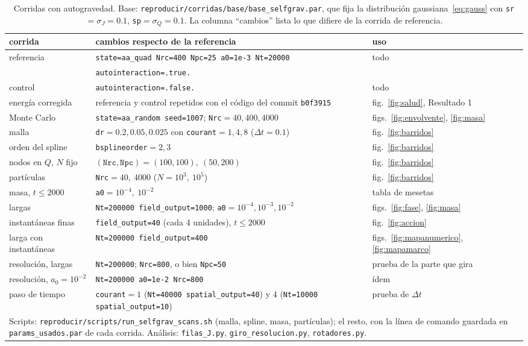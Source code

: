 \documentclass[11pt,a4paper]{article}
\newcommand{\Qr}{Q}
\theoremstyle{definition}
\begin{document}
\begin{table}[ht]
\centering
\small
\caption{Corridas con autogravedad. Base: \texttt{reproducir/corridas/base/base\_selfgrav.par}, que
fija la distribución gaussiana~\eqref{eq:gauss} con \texttt{sr}$=\sigma_J=0.1$,
\texttt{sp}$=\sigma_Q=0.1$. La columna ``cambios'' lista lo que difiere de la corrida
de referencia.}
\label{tab:autogravedad}
\footnotesize
\begin{tabular}{p{}p{}p{}}
\toprule
corrida & cambios respecto de la referencia & uso \\
\midrule
referencia & \texttt{state=aa\_quad Nrc=400 Npc=25 a0=1e-3 Nt=20000} & todo \\
 & \texttt{autointeraction=.true.} & \\
control & \texttt{autointeraction=.false.} & todo \\
energía corregida & referencia y control repetidos con el código del commit \texttt{b0f3915} & fig.~\ref{fig:salud}, Resultado 1 \\
Monte Carlo & \texttt{state=aa\_random seed=1007}; \texttt{Nrc}$=40,400,4000$ & figs.~\ref{fig:envolvente}, \ref{fig:masa} \\
malla & \texttt{dr}$=0.2,0.05,0.025$ con \texttt{courant}$=1,4,8$ ($\Delta t=0.1$) & fig.~\ref{fig:barridos} \\
orden del spline & \texttt{bsplineorder}$=2,3$ & fig.~\ref{fig:barridos} \\
nodos en $\Qr$, $N$ fijo & $(\texttt{Nrc},\texttt{Npc})=(100,100),\ (50,200)$ & fig.~\ref{fig:barridos} \\
partículas & \texttt{Nrc}$=40,\ 4000$ ($N=10^3,\ 10^5$) & fig.~\ref{fig:barridos} \\
masa, $t\le2000$ & \texttt{a0}$=10^{-4},\ 10^{-2}$ & tabla de mesetas \\
largas & \texttt{Nt=200000 field\_output=1000}; \texttt{a0}$=10^{-4},10^{-3},10^{-2}$ & figs.~\ref{fig:fase}, \ref{fig:masa} \\
instantáneas finas & \texttt{field\_output=40} (cada 4 unidades), $t\le2000$ & fig.~\ref{fig:accion} \\
larga con instantáneas & \texttt{Nt=200000 field\_output=400} & figs.~\ref{fig:mapanumerico}, \ref{fig:mapamarco} \\
resolución, largas & \texttt{Nt=200000}; \texttt{Nrc=800}, o bien \texttt{Npc=50} & prueba de la parte que gira \\
resolución, $a_0=10^{-2}$ & \texttt{Nt=200000 a0=1e-2 Nrc=800} & ídem \\
paso de tiempo & \texttt{courant}$=1$ (\texttt{Nt=40000 spatial\_output=40}) y $4$ (\texttt{Nt=10000 spatial\_output=10}) & prueba de $\Delta t$ \\
\midrule
\multicolumn{3}{p{0.94\textwidth}}{Scripts: \texttt{reproducir/scripts/run\_selfgrav\_scans.sh}
(malla, spline, masa, partículas); el resto, con la línea de comando guardada en
\texttt{params\_usados.par} de cada corrida. Análisis: \texttt{filas\_J.py},
\texttt{giro\_resolucion.py}, \texttt{rotadores.py}.} \\
\bottomrule
\end{tabular}
\end{table}
\end{document}
